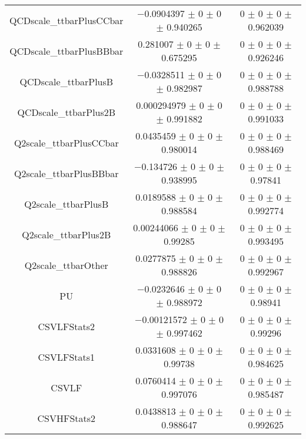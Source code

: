 \begin{table}
\begin{tabular}{ccc}
QCDscale\_ttbarPlusCCbar & \num{-0.0904397} $\pm$ \num{0} $\pm$ \num{0} $\pm$ \num{0.940265} & \num{0} $\pm$ \num{0} $\pm$ \num{0} $\pm$ \num{0.962039}\\
QCDscale\_ttbarPlusBBbar & \num{0.281007} $\pm$ \num{0} $\pm$ \num{0} $\pm$ \num{0.675295} & \num{0} $\pm$ \num{0} $\pm$ \num{0} $\pm$ \num{0.926246}\\
QCDscale\_ttbarPlusB & \num{-0.0328511} $\pm$ \num{0} $\pm$ \num{0} $\pm$ \num{0.982987} & \num{0} $\pm$ \num{0} $\pm$ \num{0} $\pm$ \num{0.988788}\\
QCDscale\_ttbarPlus2B & \num{0.000294979} $\pm$ \num{0} $\pm$ \num{0} $\pm$ \num{0.991882} & \num{0} $\pm$ \num{0} $\pm$ \num{0} $\pm$ \num{0.991033}\\
Q2scale\_ttbarPlusCCbar & \num{0.0435459} $\pm$ \num{0} $\pm$ \num{0} $\pm$ \num{0.980014} & \num{0} $\pm$ \num{0} $\pm$ \num{0} $\pm$ \num{0.988469}\\
Q2scale\_ttbarPlusBBbar & \num{-0.134726} $\pm$ \num{0} $\pm$ \num{0} $\pm$ \num{0.938995} & \num{0} $\pm$ \num{0} $\pm$ \num{0} $\pm$ \num{0.97841}\\
Q2scale\_ttbarPlusB & \num{0.0189588} $\pm$ \num{0} $\pm$ \num{0} $\pm$ \num{0.988584} & \num{0} $\pm$ \num{0} $\pm$ \num{0} $\pm$ \num{0.992774}\\
Q2scale\_ttbarPlus2B & \num{0.00244066} $\pm$ \num{0} $\pm$ \num{0} $\pm$ \num{0.99285} & \num{0} $\pm$ \num{0} $\pm$ \num{0} $\pm$ \num{0.993495}\\
Q2scale\_ttbarOther & \num{0.0277875} $\pm$ \num{0} $\pm$ \num{0} $\pm$ \num{0.988826} & \num{0} $\pm$ \num{0} $\pm$ \num{0} $\pm$ \num{0.992967}\\
PU & \num{-0.0232646} $\pm$ \num{0} $\pm$ \num{0} $\pm$ \num{0.988972} & \num{0} $\pm$ \num{0} $\pm$ \num{0} $\pm$ \num{0.98941}\\
CSVLFStats2 & \num{-0.00121572} $\pm$ \num{0} $\pm$ \num{0} $\pm$ \num{0.997462} & \num{0} $\pm$ \num{0} $\pm$ \num{0} $\pm$ \num{0.99296}\\
CSVLFStats1 & \num{0.0331608} $\pm$ \num{0} $\pm$ \num{0} $\pm$ \num{0.99738} & \num{0} $\pm$ \num{0} $\pm$ \num{0} $\pm$ \num{0.984625}\\
CSVLF & \num{0.0760414} $\pm$ \num{0} $\pm$ \num{0} $\pm$ \num{0.997076} & \num{0} $\pm$ \num{0} $\pm$ \num{0} $\pm$ \num{0.985487}\\
CSVHFStats2 & \num{0.0438813} $\pm$ \num{0} $\pm$ \num{0} $\pm$ \num{0.988647} & \num{0} $\pm$ \num{0} $\pm$ \num{0} $\pm$ \num{0.992625}\\

\end{tabular}
\end{table}
